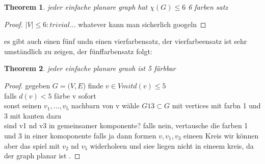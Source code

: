 \documentclass[a4paper]{article}
\newtheorem{theorem}{Theorem}[section]
\theoremstyle{definition}
\theoremstyle{remark}
\begin{document}
\begin{theorem}
  jeder einfache planare graph hat $\chi(G)\leq 6 $ 6 farben satz
\end{theorem}
\begin{proof}
  $|V|\leq6: trivial\dots$
  whatever kann man sicherlich googeln
\end{proof}
es gibt auch einen fünf undn einen vierfarbensatz, der vierfarbeensatz ist sehr umständlich zu zeigen, der fünffarbensatz folgt:
\begin{theorem}
  jeder einfache planare graoh ist 5 färbbar
\end{theorem}
\begin{proof}
  gegeben $G=(V,E$)
  finde $v\in V mit d(v)\leq 5$\\
  falls $d(v)<5$ färbe v sofort\\
  sonst seinen $v_1,\dots,v_5$ nachbarn von v 
  wähle $G13\subset G$ mit vertices mit farbn 1 und 3 mit kanten dazu \\
  sind v1 nd v3 in gemeinsamer komponente?
  falls nein, vertausche die farben 1 und 3 in einer komoponente
  falls ja dann formen $v,v_1,v_3$ eineen Kreis  wir können aber das spiel mit $v_2$ nd $v_5$ widerholeen und siee liegen nicht in eineem kreis, da der graph planar ist . 
\end{proof}




\end{document}
